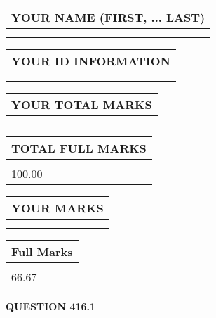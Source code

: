 \documentclass{ctexart}
\begin{document}
 
 
   
   
\newpage 
\setcounter{page}{ 
   416001 } 
   
   
   
   
\noindent\begin{tabular}{|l|}
\hline
YOUR NAME (FIRST, ... LAST)  \\
\hline
 \\ 
 \\ 
\hline
\end{tabular}
\hspace{0.05in} \begin{tabular}{|l|}
\hline
 YOUR   ID   INFORMATION  \\
\hline
 \\ 
 \\ 
\hline
\end{tabular}
   
   
\vspace{0.2in}\noindent\begin{tabular}{|l|}
\hline
YOUR TOTAL MARKS  \\
\hline
 \\ 
 \\ 
\hline
\end{tabular}
\hspace{0.05in} \begin{tabular}{|l|}
\hline
TOTAL FULL MARKS  \\
\hline
 \\ 
100.00 \\
\hline
\end{tabular}
   
   
 \vspace{0.2in}
 
 
 
 
   
   
  
\vspace{0.2in}
  
\noindent\begin{tabular}{|l|}
\hline
 YOUR MARKS  \\
\hline
 \\ 
 \\ 
\hline
\end{tabular}
\hspace{0.05in} \begin{tabular}{|l|}
\hline
 Full Marks  \\
\hline
 \\ 
66.67 \\
\hline
\end{tabular}
{\textbf{\Large{QUESTION
416.1 
}}}
  
\end{document}
